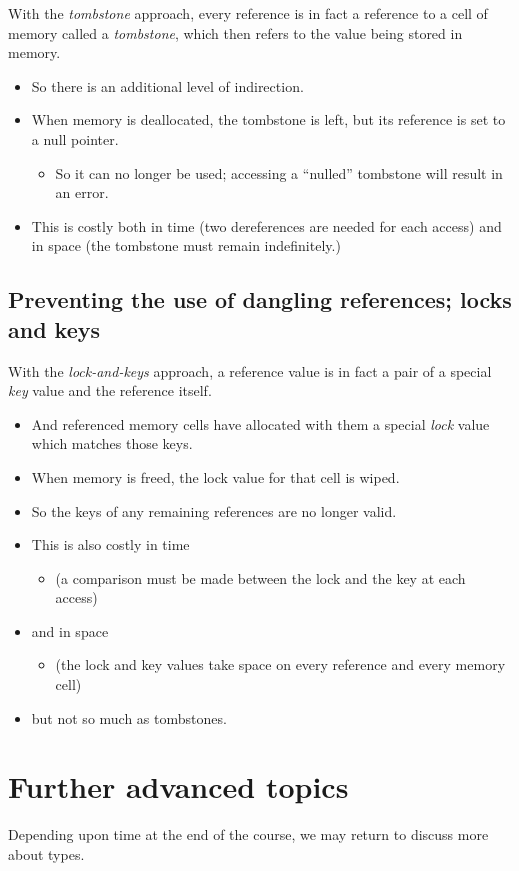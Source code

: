 \documentclass[11pt]{article}
\theoremstyle{definition}
\begin{document}
With the \emph{tombstone} approach, every reference is in fact
a reference to a cell of memory called a \emph{tombstone},
which then refers to the value being stored in memory.
\begin{itemize}
\item So there is an additional level of indirection.
\item When memory is deallocated, the tombstone is left,
but its reference is set to a null pointer.
\begin{itemize}
\item So it can no longer be used; accessing a “nulled” tombstone
will result in an error.
\end{itemize}
\item This is costly both in time (two dereferences are needed for each access)
and in space (the tombstone must remain indefinitely.)
\end{itemize}

\subsection{Preventing the use of dangling references; locks and keys}
\label{sec:org604f9db}

With the \emph{lock-and-keys} approach, a reference value is in fact
a pair of a special \emph{key} value and the reference itself.
\begin{itemize}
\item And referenced memory cells have allocated with them a
special \emph{lock} value which matches those keys.
\item When memory is freed, the lock value for that cell is wiped.
\item So the keys of any remaining references are no longer valid.
\item This is also costly in time
\begin{itemize}
\item (a comparison must be made between
the lock and the key at each access)
\end{itemize}
\item and in space
\begin{itemize}
\item (the lock and key values take space on every reference
and every memory cell)
\end{itemize}
\item but not so much as tombstones.
\end{itemize}

\section{Further advanced topics}
\label{sec:orgc1a1fe9}

Depending upon time at the end of the course,
we may return to discuss more about types.
\end{document}
